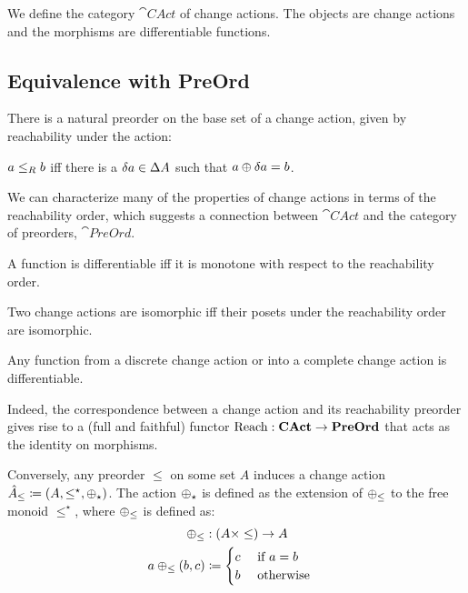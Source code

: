 \begin{defn}
  We define the category $\cat{CAct}$ of change actions. The objects are
  change actions and the morphisms are differentiable functions. 
\end{defn}

\subsection{Equivalence with PreOrd}

There is a natural preorder on the base set of a change action, given by reachability
under the action:

\begin{defn}
  $a \leq_R b$ iff there is a $\delta a \in \Delta A$ such that $a \oplus
  \delta a = b$.
\end{defn}

We can characterize many of the properties of change actions in terms of the reachability order,
which suggests a connection between $\cat{CAct}$ and the category of preorders, $\cat{PreOrd}$.

\begin{prop}
  A function is differentiable iff it is monotone with respect to the
  reachability order. 
\end{prop}

\begin{corollary}
  Two change actions are isomorphic iff their posets under the reachability
  order are isomorphic.
\end{corollary}

\begin{corollary}
  Any function from a discrete change action or into a complete change
  action is differentiable.
\end{corollary}

Indeed, the correspondence between a change action and its reachability preorder gives rise to
a (full and faithful) functor $\operatorname{Reach} : \mathbf{CAct} \rightarrow \mathbf{PreOrd}$ that acts as the
identity on morphisms.

Conversely, any preorder $\leq$ on some set $A$ induces a change action
$\hat{A}_\leq \coloneqq (A,\leq^\star,\oplus_\star)$.
The action $\oplus_\star$ is defined as the extension of $\oplus_\leq$ to the free
monoid $\leq^\star$, where $\oplus_\leq$ is defined as:
\[
\begin{aligned}
   \oplus_\leq &: (A \times \leq) \rightarrow A&\\
   a \oplus_\leq (b, c) &\coloneqq
     \begin{cases}
     c&\text{ if $a = b$}\\
     b&\text{ otherwise}
     \end{cases}
\end{aligned}
\]

